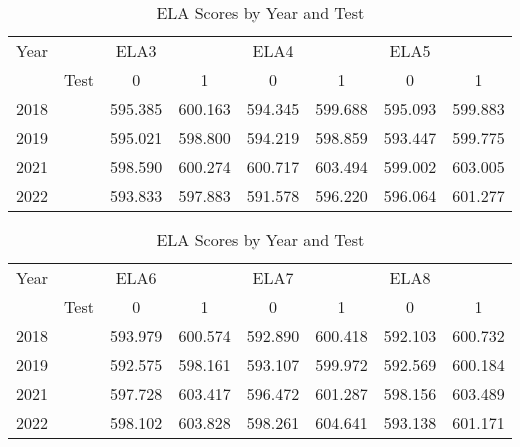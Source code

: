 \documentclass{article}
\begin{document}
\begin{table}[ht]
\centering
\caption{ELA Scores by Year and Test}
\begin{tabular}{@{}llcccccc@{}}
\toprule
Year &  & ELA3 &  & ELA4 &  & ELA5 &  \\
\cmidrule(lr){3-4} \cmidrule(lr){5-6} \cmidrule(lr){7-8}
 & Test & 0 & 1 & 0 & 1 & 0 & 1 \\
\midrule
2018 &  & 595.385 & 600.163 & 594.345 & 599.688 & 595.093 & 599.883 \\
2019 &  & 595.021 & 598.800 & 594.219 & 598.859 & 593.447 & 599.775 \\
2021 &  & 598.590 & 600.274 & 600.717 & 603.494 & 599.002 & 603.005 \\
2022 &  & 593.833 & 597.883 & 591.578 & 596.220 & 596.064 & 601.277 \\
\bottomrule
\end{tabular}
\quad
\begin{tabular}{@{}llcccccc@{}}
\toprule
Year &  & ELA6 &  & ELA7 &  & ELA8 &  \\
\cmidrule(lr){3-4} \cmidrule(lr){5-6} \cmidrule(lr){7-8}
 & Test & 0 & 1 & 0 & 1 & 0 & 1 \\
\midrule
2018 &  & 593.979 & 600.574 & 592.890 & 600.418 & 592.103 & 600.732 \\
2019 &  & 592.575 & 598.161 & 593.107 & 599.972 & 592.569 & 600.184 \\
2021 &  & 597.728 & 603.417 & 596.472 & 601.287 & 598.156 & 603.489 \\
2022 &  & 598.102 & 603.828 & 598.261 & 604.641 & 593.138 & 601.171 \\
\bottomrule
\end{tabular}
\label{tab:ela_scores}
\end{table}
\end{document}
